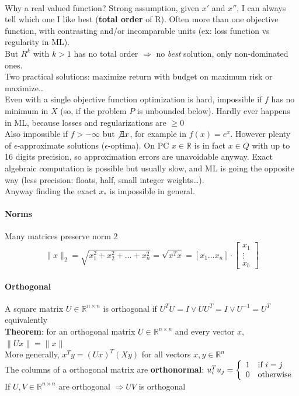 \documentclass[10pt]{report}
\begin{document}
\paragraph{} Why a real valued function? Strong assumption, given $x'$ and $x''$, I can always tell which one I like best (\textbf{total order} of R). Often more than one objective function, with contrasting and/or incomparable units (ex: loss function vs regularity in ML).\\
But $R^k$ with $k > 1$ has no total order $\Rightarrow$ no \textit{best} solution, only non-dominated ones.\\
Two practical solutions: maximize return with budget on maximum risk or maximize\ldots\\
Even with a single objective function optimization is hard, impossible if $f$ has no minimum in $X$ (so, if the problem $P$ is unbounded below). Hardly ever happens in ML, because losses and regularizations are $\geq 0$\\
Also impossible if $f > -\infty$ but $\not\exists x$, for example in $f(x) = e^x$. However plenty of $\epsilon$-approximate solutions ($\epsilon$-optima). On PC $x\in \mathbb{R}$ is in fact $x\in Q$ with up to 16 digits precision, so approximation errors are unavoidable anyway. Exact algebraic computation is possible but usually slow, and ML is going the opposite way (less precision: floats, half, small integer weights\ldots).\\
Anyway finding the exact $x_*$ is impossible in general.
\paragraph{Norms} Many matrices preserve norm 2
 $$\|x\|_2 = \sqrt{x_1^2 + x_2^2 + \ldots + x_n^2} = \sqrt{x^T x} = \left[x_1 \ldots x_n\right]\cdot\left[\begin{array}{c}
	x_1\\\vdots\\x_b
	\end{array}\right]$$
\paragraph{Orthogonal} A square matrix $U\in \mathbb{R}^{n\times n}$ is orthogonal if $U^TU = I \vee UU^T = I \vee U^{-1} = U^T$ equivalently\\
\textbf{Theorem}: for an orthogonal matrix $U\in \mathbb{R}^{n\times n}$ and every vector $x$, $\|Ux\| = \|x\|$\\
More generally, $x^T y = (Ux)^T(Xy)$ for all vectors $x,y\in \mathbb{R}^n$\\
The columns of a orthogonal matrix are \textbf{orthonormal}: $u_i^Tu_j = \left\{\begin{array}{l l}
1 &\text{if } i = j\\0&\text{otherwise}
\end{array}\right.$\\
If $U,V\in \mathbb{R}^{n\times n}$ are orthogonal $\Rightarrow UV$ is orthogonal
\end{document}
